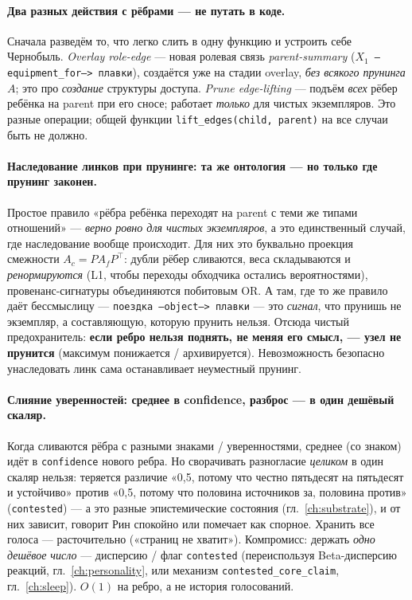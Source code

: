 \paragraph{Два разных действия с рёбрами --- не путать в коде.}
Сначала разведём то, что легко слить в одну функцию и устроить себе
Чернобыль. \emph{Overlay role-edge} --- новая ролевая связь
\emph{parent-summary} (\texttt{$X_1$ --equipment\_for--> плавки}), создаётся уже
на стадии overlay, \emph{без всякого прунинга} $A$; это про \emph{создание}
структуры доступа. \emph{Prune edge-lifting} --- подъём \emph{всех} рёбер
ребёнка на parent при его сносе; работает \emph{только} для чистых
экземпляров. Это разные операции; общей функции
\texttt{lift\_edges(child, parent)} на все случаи быть не должно.

\paragraph{Наследование линков при прунинге: та же онтология --- но только где прунинг законен.}
Простое правило «рёбра ребёнка переходят на parent с теми же типами
отношений» --- \emph{верно ровно для чистых экземпляров}, а это единственный
случай, где наследование вообще происходит. Для них это буквально проекция
смежности $A_c = P A_f P^\top$: дубли рёбер сливаются, веса складываются и
\emph{ренормируются} (L1, чтобы переходы обходчика остались вероятностями),
провенанс-сигнатуры объединяются побитовым OR. А там, где то же правило даёт
бессмыслицу --- \texttt{поездка --object--> плавки} --- это \emph{сигнал}, что
прунишь не экземпляр, а составляющую, которую прунить нельзя. Отсюда чистый
предохранитель: \textbf{если ребро нельзя поднять, не меняя его смысл, --- узел
не прунится} (максимум понижается / архивируется). Невозможность безопасно
унаследовать линк сама останавливает неуместный прунинг.

\paragraph{Слияние уверенностей: среднее в confidence, разброс --- в один дешёвый скаляр.}
Когда сливаются рёбра с разными знаками / уверенностями, среднее (со знаком)
идёт в \texttt{confidence} нового ребра. Но сворачивать разногласие
\emph{целиком} в один скаляр нельзя: теряется различие «0,5, потому что честно
пятьдесят на пятьдесят и устойчиво» против «0,5, потому что половина
источников за, половина против» (\texttt{contested}) --- а это разные
эпистемические состояния (гл.~\ref{ch:substrate}), и от них зависит, говорит
Рин спокойно или помечает как спорное. Хранить все голоса --- расточительно
(«страниц не хватит»). Компромисс: держать \emph{одно дешёвое число} ---
дисперсию / флаг \texttt{contested} (переиспользуя Beta-дисперсию реакций,
гл.~\ref{ch:personality}, или механизм \texttt{contested\_core\_claim},
гл.~\ref{ch:sleep}). $O(1)$ на ребро, а не история голосований.

